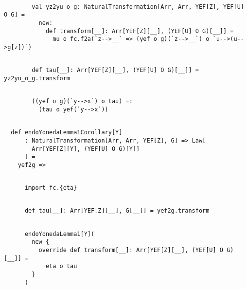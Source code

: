 \documentclass[11pt]{article}
\def\edefn{\endgroup\par\pagebreak[2]\addvspace{\medskipamount}}
\let\ecode=\edefn
\begin{document}
\vspace{6pt}
\begin{mdframed}[backgroundcolor=lightgray!20] 
\begin{lstlisting}

        val yz2yu_o_g: NaturalTransformation[Arr, Arr, YEF[Z], YEF[U] O G] =
          new:
            def transform[__]: Arr[YEF[Z][__], (YEF[U] O G)[__]] =
              mu o fc.f2a(`z-->__` => (yef o g)(`z-->__`) o `u-->(u-->g[z])`)
\end{lstlisting}
\end{mdframed}
\vspace{6pt}
\begin{mdframed}[backgroundcolor=lightgray!20] 
\begin{lstlisting}

        def tau[__]: Arr[YEF[Z][__], (YEF[U] O G)[__]] = yz2yu_o_g.transform
\end{lstlisting}
\end{mdframed}
\vspace{6pt}
\begin{mdframed}[backgroundcolor=lightgray!20] 
\begin{lstlisting}

        ((yef o g)(`y-->x`) o tau) =:
          (tau o yef(`y-->x`))
\end{lstlisting}
\end{mdframed}
\vspace{6pt}
\begin{mdframed}[backgroundcolor=lightgray!20] 
\begin{lstlisting}

  def endoYonedaLemma1Corollary[Y]
      : NaturalTransformation[Arr, Arr, YEF[Z], G] => Law[
        Arr[YEF[Z][Y], (YEF[U] O G)[Y]]
      ] =
    yef2g =>
\end{lstlisting}
\end{mdframed}
\vspace{6pt}
\begin{mdframed}[backgroundcolor=lightgray!20] 
\begin{lstlisting}

      import fc.{eta}
\end{lstlisting}
\end{mdframed}
\vspace{6pt}
\begin{mdframed}[backgroundcolor=lightgray!20] 
\begin{lstlisting}

      def tau[__]: Arr[YEF[Z][__], G[__]] = yef2g.transform
\end{lstlisting}
\end{mdframed}
\vspace{6pt}
\begin{mdframed}[backgroundcolor=lightgray!20] 
\begin{lstlisting}

      endoYonedaLemma1[Y](
        new {
          override def transform[__]: Arr[YEF[Z][__], (YEF[U] O G)[__]] =
            eta o tau
        }
      )
\end{lstlisting}
\end{mdframed}
\ecode
\end{document}
